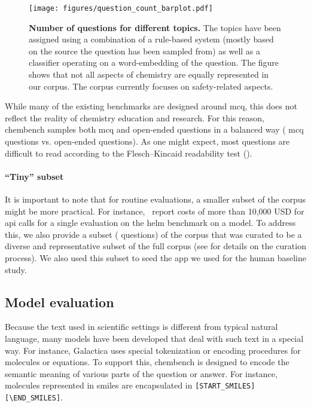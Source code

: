 \documentclass[11pt, oneside]{article}
\begin{document}
\begin{figure}
    \centering
    \texttt{[image: figures/question\_count\_barplot.pdf]}
    \caption{\textbf{Number of questions for different topics.} The topics have been assigned using a combination of a rule-based system (mostly based on the source the question has been sampled from) as well as a classifier operating on a word-embedding of the question. 
    The figure shows that not all aspects of chemistry are equally represented in our corpus. The corpus currently focuses on safety-related aspects.}
    \label{fig:topic_barplot}
\end{figure}

While many of the existing benchmarks are designed around \gls{mcq}, this does not reflect the reality of chemistry education and research.
For this reason, chembench samples both \gls{mcq} and open-ended questions in a balanced way ( \gls{mcq} questions vs.  open-ended questions).
As one might expect, most questions are difficult to read according to the Flesch–Kincaid readability test ().\cite{kincaid1975derivation}


\paragraph{\enquote{Tiny} subset}
It is important to note that for routine evaluations, a smaller subset of the corpus might be more practical.\cite{polo2024tinybenchmarks}
For instance,~\citet{liang2023holistic} report costs of more than 10,000 USD for \gls{api} calls for a single evaluation on the \gls{helm} benchmark on a model. 
To address this, we also provide a subset ( questions) of the corpus that was curated to be a diverse and representative subset of the full corpus (see  for details on the curation process).
We also used this subset to seed the app we used for the human baseline study. 


\subsection{Model evaluation}

Because the text used in scientific settings is different from typical natural language, many models have been developed that deal with such text in a special way.
For instance, Galactica\cite{taylor2022galactica} uses special tokenization or encoding procedures for molecules or equations.
To support this, chembench is designed to encode the semantic meaning of various parts of the question or answer.  
For instance, molecules represented in \gls{smiles} are encapsulated in \texttt{[START\_SMILES][\textbackslash END\_SMILES]}.
\end{document}
